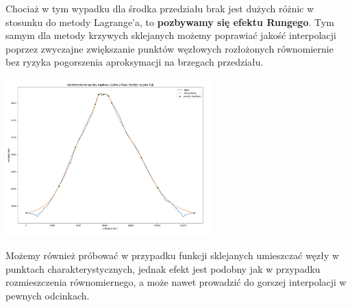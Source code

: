 \documentclass{article}
\begin{document}
Chociaż w tym wypadku dla środka przedziału brak jest dużych różnic w stosunku do metody Lagrange'a, to \textbf{pozbywamy się efektu Rungego}. Tym samym 
dla metody krzywych sklejanych możemy poprawiać jakość interpolacji poprzez zwyczajne zwiększanie punktów węzłowych rozłożonych równomiernie
bez ryzyka pogorszenia aproksymacji na brzegach przedziału.
 \begin{center}
	\includegraphics[width=8cm]{spline_fuji_non}
\end{center}
Możemy również próbować w przypadku funkcji sklejanych umieszczać węzły w punktach charakterystycznych, jednak efekt jest podobny jak w przypadku
rozmieszczenia równomiernego, a może nawet prowadzić do gorszej interpolacji w pewnych odcinkach.
\end{document}
